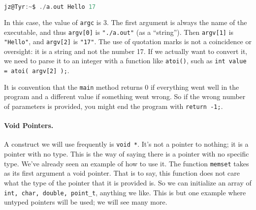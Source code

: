 \begin{lstlisting}[language=C]
jz@Tyr:~$ ./a.out Hello 17
\end{lstlisting}

In this case, the value of \texttt{argc} is 3. The first argument is always the name of the executable, and thus \texttt{argv[0]} is \texttt{"./a.out"} (as a ``string''). Then \texttt{argv[1]} is \texttt{"Hello"}, and \texttt{argv[2]} is \texttt{"17"}.  The use of quotation marks is not a coincidence or oversight: it is a string and not the number 17. If we actually want to convert it, we need to parse it to an integer with a function like \texttt{atoi()}, such as \texttt{int value = atoi( argv[2] );}.

It is convention that the \texttt{main} method returns 0 if everything went well in the program and a different value if something went wrong. So if the wrong number of parameters is provided, you might end the program with \texttt{return -1;}.



\paragraph{Void Pointers.}

A construct we will use frequently is \texttt{void *}. It's not a pointer to nothing; it is a pointer with no type. This is the way of saying there is a pointer with no specific type. We've already seen an example of how to use it. The function \texttt{memset} takes as its first argument a void pointer. That is to say, this function does not care what the type of the pointer that it is provided is. So we can initialize an array of \texttt{int, char, double, point\_t}, anything we like. This is but one example where untyped pointers will be used; we will see many more.





